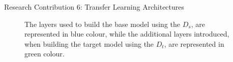 \documentclass{beamer}
\begin{document}
\begin{frame}{Research Contribution 6: Transfer Learning Architectures}  
\begin{figure}[ht]
\centering
{}%
{}%
\caption{\tiny The layers used to build the base model using the $D_s$, are represented in blue colour, while the additional layers introduced, when building the target model using the $D_t$, are represented in green colour.}
\label{fig:transfarch}
\end{figure}
\end{frame}
\end{document}
